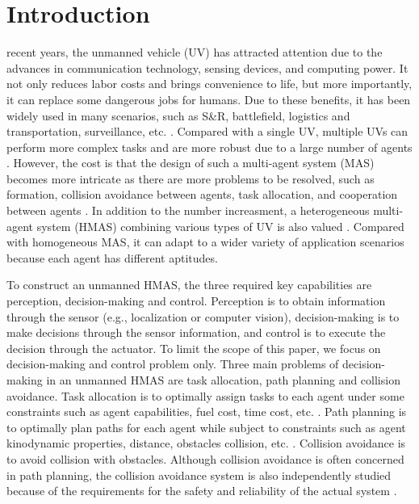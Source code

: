 \documentclass{ieeeaccess}
\begin{document}
\section{Introduction}
 recent years, the unmanned vehicle (UV) has attracted attention due to the advances in communication technology, sensing devices, and computing power. It not only reduces labor costs and brings convenience to life, but more importantly, it can replace some dangerous jobs for humans. Due to these benefits, it has been widely used in many scenarios, such as S\&R, battlefield, logistics and transportation, surveillance, etc. \cite{9700861}. Compared with a single UV, multiple UVs can perform more complex tasks and are more robust due to a large number of agents \cite{8352646}. However, the cost is that the design of such a multi-agent system (MAS) becomes more intricate as there are more problems to be resolved, such as formation, collision avoidance between agents, task allocation, and cooperation between agents \cite{chen2019control}. In addition to the number increasment, a heterogeneous multi-agent system (HMAS) combining various types of UV is also valued \cite{9371292}. Compared with homogeneous MAS, it can adapt to a wider variety of application scenarios because each agent has different aptitudes.

To construct an unmanned HMAS, the three required key capabilities are perception, decision-making and control. Perception is to obtain information through the sensor (e.g., localization or computer vision), decision-making is to make decisions through the sensor information, and control is to execute the decision through the actuator. To limit the scope of this paper, we focus on decision-making and control problem only. Three main problems of decision-making in an unmanned HMAS are task allocation, path planning and collision avoidance. Task allocation is to optimally assign tasks to each agent under some constraints such as agent capabilities, fuel cost, time cost, etc. \cite{skaltsis2021survey}. Path planning is to optimally plan paths for each agent while subject to constraints such as agent kinodynamic properties, distance, obstacles collision, etc. \cite{zhang2018path}. Collision avoidance is to avoid collision with obstacles. Although collision avoidance is often concerned in path planning, the collision avoidance system is also independently studied because of the requirements for the safety and reliability of the actual system \cite{9108245}.
\end{document}
